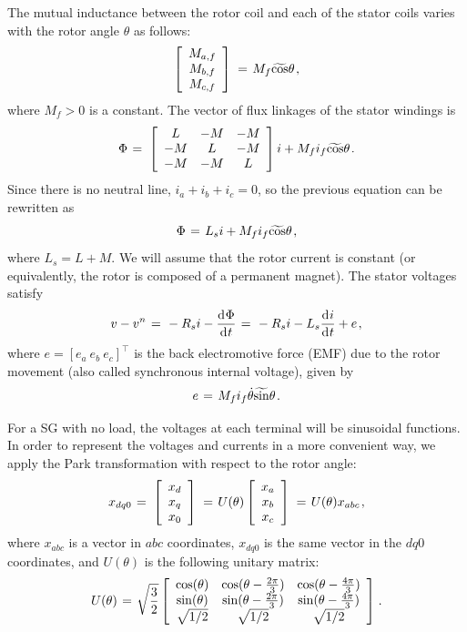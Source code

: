 \documentclass[conference]{IEEEtran}
\newcommand{\BE}{\begin{equation}}
\newcommand{\BEQ}[1]{\BE\label{#1}} %
\newcommand{\m}      {{\hbox{\hskip 1pt}}}
\newcommand{\dd}     {{\rm d\hbox{\hskip 0.5pt}}}
\begin{document}
The mutual inductance between the rotor coil and each of the stator
coils varies with the rotor angle $\theta$ as follows:
$$ \left[\begin{array}{c} M_{a,f}\\ M_{b,f}\\ M_{c,f}\end{array}
   \right] \m=\m M_{f}\widetilde{\cos}\theta \m,$$
where $M_f>0$ is a constant. The vector of flux linkages of the stator
windings is
$$ \Phi \m=\m \left[\begin{array}{ccc} L & -M & -M\\ -M & L & -M\\
   -M & -M & L \end{array}\right]i + M_f i_f\widetilde{\cos}\theta
   \m.$$
Since there is no neutral line, $i_a+i_b+i_c=0$, so the previous
equation can be rewritten as 
$$\Phi \m=\m L_s i + M_f i_f \widetilde{\cos}\theta \m,$$
where $L_s=L+M$. We will assume that the rotor current is constant
(or equivalently, the rotor is composed of a permanent magnet). The
stator voltages satisfy
\BEQ{eq:SGTerminalVlotage}
   v - v^n \m=\m -R_{s}i-\frac{\dd\Phi}{\dd t} \m=\m -R_{s}i-L_{s}
   \frac{\dd i}{\dd t} + e \m,
\end{equation}
where $e=\left[e_a\ e_b\ e_c \right] ^\top$ is the back electromotive 
force (EMF) due to the rotor movement (also called synchronous 
internal voltage), given by \vspace{-2mm}
\BEQ{eq:emf}
   e \m=\m M_f i_f\dot{\theta}\widetilde{\sin}\theta \m.
\end{equation}

For a SG with no load, the voltages at each terminal
will be sinusoidal functions. In order to represent the voltages and
currents in a more convenient way, we apply the Park transformation
with respect to the rotor angle:
$$ x_{dq0} \m=\m \left[\begin{array}{c} x_{d}\\ x_{q}\\ x_{0}
   \end{array}\right] \m=\m U(\theta) \left[\begin{array}{c} x_{a}\\
   x_b\\ x_c\end{array}\right] \m=\m U(\theta) x_{abc} \m,$$
where $x_{abc}$ is a vector in $abc$ coordinates, $x_{dq0}$
is the same vector in the $dq0$ coordinates, and $U(\theta)$ is the
following unitary matrix:
\BEQ{eq:ParkTransformation}
 U(\theta) \m=\m \sqrt{\frac{3}{2}}\left[\begin{array}{ccc}
   \cos(\theta) & \cos(\theta-\frac{2\pi}{3}) & \cos(\theta-
   \frac{4\pi}{3})\\ \sin(\theta) & \sin(\theta-\frac{2\pi}{3})
   & \sin(\theta-\frac{4\pi}{3})\\ \sqrt{1/2} & \sqrt{1/2} & 
   \sqrt{1/2} \end{array}\right] \m.
\end{equation}
\end{document}
